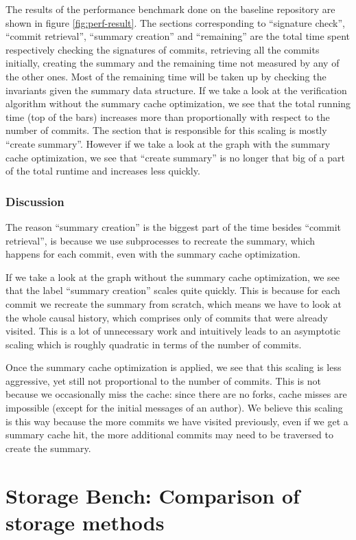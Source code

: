 The results of the performance benchmark done on the baseline repository are shown in figure \ref{fig:perf-result}. The sections corresponding to ``signature check'', ``commit retrieval'', ``summary creation'' and ``remaining'' are the total time spent respectively checking the signatures of commits, retrieving all the commits initially, creating the summary and the remaining time not measured by any of the other ones. Most of the remaining time will be taken up by checking the invariants given the summary data structure.
If we take a look at the verification algorithm without the summary cache optimization, we see that the total running time (top of the bars) increases more than proportionally with respect to the number of commits. The section that is responsible for this scaling is mostly ``create summary''. However if we take a look at the graph with the summary cache optimization, we see that ``create summary'' is no longer that big of a part of the total runtime and increases less quickly.

\subsubsection{Discussion}
The reason ``summary creation'' is the biggest part of the time besides ``commit retrieval'', is because we use subprocesses to recreate the summary, which happens for each commit, even with the summary cache optimization.

If we take a look at the graph without the summary cache optimization, we see that the label ``summary creation'' scales quite quickly. This is because for each commit we recreate the summary from scratch, which means we have to look at the whole causal history, which comprises only of commits that were already visited. This is a lot of unnecessary work and intuitively leads to an asymptotic scaling which is roughly quadratic in terms of the number of commits.

Once the summary cache optimization is applied, we see that this scaling is less aggressive, yet still not proportional to the number of commits. This is not because we occasionally miss the cache: since there are no forks, cache misses are impossible (except for the initial messages of an author). We believe this scaling is this way because the more commits we have visited previously, even if we get a summary cache hit, the more additional commits may need to be traversed to create the summary.

\section{Storage Bench: Comparison of storage methods}
